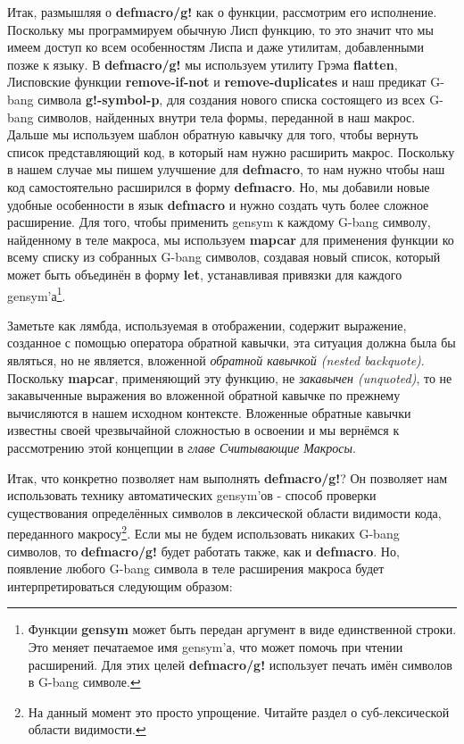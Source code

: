 Итак, размышляя о \textbf{defmacro/g!} как о функции, рассмотрим его исполнение. Поскольку мы программируем обычную Лисп функцию, то это значит что мы имеем доступ ко всем особенностям Лиспа и даже утилитам, добавленными позже к языку. В \textbf{defmacro/g!} мы используем утилиту Грэма \textbf{flatten}, Лисповские функции \textbf{remove-if-not} и \textbf{remove-duplicates} и наш предикат G-bang символа \textbf{g!-symbol-p}, для создания нового списка состоящего из всех G-bang символов, найденных внутри тела формы, переданной в наш макрос. Дальше мы используем шаблон обратную кавычку для того, чтобы вернуть список представляющий код, в который нам нужно расширить макрос. Поскольку в нашем случае мы пишем улучшение для \textbf{defmacro}, то нам нужно чтобы наш код самостоятельно расширился в форму \textbf{defmacro}. Но, мы добавили новые удобные особенности в язык \textbf{defmacro} и нужно создать чуть более сложное расширение. Для того, чтобы применить gensym к каждому G-bang символу, найденному в теле макроса, мы используем \textbf{mapcar} для применения функции ко всему списку из собранных G-bang символов, создавая новый список, который может быть объединён в форму \textbf{let}, устанавливая привязки для каждого gensym'а\footnote{Функции \textbf{gensym} может быть передан аргумент в виде единственной строки. Это меняет печатаемое имя gensym'а, что может помочь при чтении расширений. Для этих целей \textbf{defmacro/g!} использует печать имён символов в G-bang символе.}.

Заметьте как лямбда, используемая в отображении, содержит выражение, созданное с помощью оператора обратной кавычки, эта ситуация должна была бы являться, но не является, вложенной \emph{обратной кавычкой (nested backquote)}. Поскольку \textbf{mapcar}, применяющий эту функцию, не \emph{закавычен (unquoted)}, то не закавыченные выражения во вложенной обратной кавычке по прежнему вычисляются в нашем исходном контексте. Вложенные обратные кавычки известны своей чрезвычайной сложностью в освоении и мы вернёмся к рассмотрению этой концепции в \emph{главе Считывающие Макросы}.

Итак, что конкретно позволяет нам выполнять \textbf{defmacro/g!}? Он позволяет нам использовать технику автоматических gensym'ов - способ проверки существования определённых символов в лексической области видимости кода, переданного макросу\footnote{На данный момент это просто упрощение. Читайте раздел о суб-лексической области видимости.}. Если мы не будем использовать никаких G-bang символов, то \textbf{defmacro/g!} будет работать также, как и \textbf{defmacro}. Но, появление любого G-bang символа в теле расширения макроса будет интерпретироваться следующим образом:

